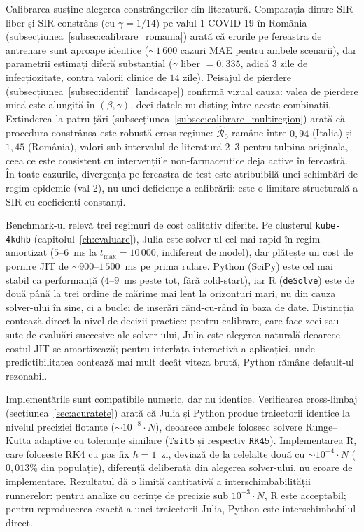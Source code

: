 Calibrarea susține alegerea constrângerilor din literatură. Comparația
dintre SIR liber și SIR constrâns (cu $\gamma = 1/14$) pe valul 1 COVID-19
în România (subsecțiunea~\ref{subsec:calibrare_romania}) arată că erorile
pe fereastra de antrenare sunt aproape identice ($\sim$$1\,600$ cazuri MAE
pentru ambele scenarii), dar parametrii estimați diferă substanțial
($\hat\gamma$ liber $= 0{,}335$, adică $3$ zile de infecțiozitate, contra
valorii clinice de $14$ zile). Peisajul de pierdere
(subsecțiunea~\ref{subsec:identif_landscape}) confirmă vizual cauza: valea
de pierdere mică este alungită în $(\beta, \gamma)$, deci datele nu disting
între aceste combinații. Extinderea la patru țări
(subsecțiunea~\ref{subsec:calibrare_multiregion}) arată că procedura
constrânsa este robustă cross-regiune: $\hat{\mathcal{R}}_0$ rămâne între
$0{,}94$ (Italia) și $1{,}45$ (România), valori sub intervalul de literatură
$2$--$3$ pentru tulpina originală, ceea ce este consistent cu intervențiile
non-farmaceutice deja active în fereastră. În toate cazurile, divergența pe
fereastra de test este atribuibilă unei schimbări de regim epidemic (val 2),
nu unei deficiențe a calibrării: este o limitare structurală a SIR cu
coeficienți constanți.

Benchmark-ul relevă trei regimuri de cost calitativ diferite. Pe clusterul
\texttt{kube-4kdhb} (capitolul~\ref{ch:evaluare}), Julia este solver-ul
cel mai rapid în regim amortizat ($5$--$6$~ms la $t_{\max}=10\,000$,
indiferent de model), dar plătește un cost de pornire JIT de
$\sim$$900$--$1\,500$~ms pe prima rulare. Python (SciPy) este cel mai
stabil ca performanță ($4$--$9$~ms peste tot, fără cold-start), iar R
(\texttt{deSolve}) este de două până la trei ordine de mărime mai lent la
orizonturi mari, nu din cauza solver-ului în sine, ci a buclei de inserări
rând-cu-rând în baza de date. Distincția contează direct la nivel de
decizii practice: pentru calibrare, care face zeci sau sute de evaluări
succesive ale solver-ului, Julia este alegerea naturală deoarece costul
JIT se amortizează; pentru interfața interactivă a aplicației, unde
predictibilitatea contează mai mult decât viteza brută, Python rămâne
default-ul rezonabil.

Implementările sunt compatibile numeric, dar nu identice. Verificarea
cross-limbaj (secțiunea~\ref{sec:acuratete}) arată că Julia și Python
produc traiectorii identice la nivelul preciziei flotante
($\sim$$10^{-8} \cdot N$), deoarece ambele folosesc solvere Runge--Kutta
adaptive cu toleranțe similare ($\texttt{Tsit5}$ și respectiv
$\texttt{RK45}$). Implementarea R, care folosește RK4 cu pas fix
$h = 1$~zi, deviază de la celelalte două cu $\sim$$10^{-4} \cdot N$
($0{,}013\%$ din populație), diferență deliberată din alegerea solver-ului,
nu eroare de implementare. Rezultatul dă o limită cantitativă a
interschimbabilității runnerelor: pentru analize cu cerințe de precizie
sub $10^{-3} \cdot N$, R este acceptabil; pentru reproducerea exactă a
unei traiectorii Julia, Python este interschimbabilul direct.

